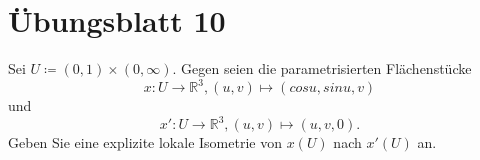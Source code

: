%
\section{Übungsblatt 10}
\setcounter{problemcounter}{0}

\begin{assignment}
 Sei $ U \coloneqq (0,1) \times (0, \infty) $. Gegen seien die parametrisierten Flächenstücke
 \begin{equation*}
    x : U \to \mathbb{R}^3, (u,v) \mapsto (cosu, sinu, v)
  \end{equation*} 
  und 
  \begin{equation*}
    x' : U \to \mathbb{R}^3, (u,v) \mapsto (u,v,0).
  \end{equation*}
  Geben Sie eine explizite lokale Isometrie von $ x(U) $ nach $ x'(U) $ an.
\end{assignment}
